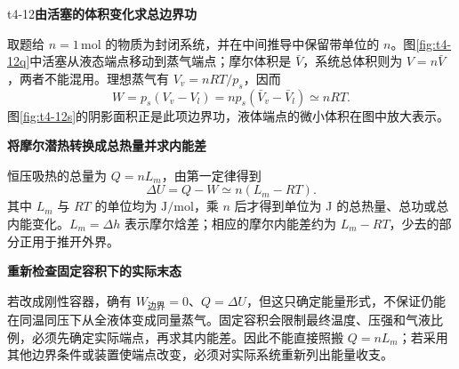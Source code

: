 \begin{drillsolution}{t4-12}\textbf{由活塞的体积变化求总边界功}\par\nobreak
取题给 $n=1\,\mathrm{mol}$ 的物质为封闭系统，并在中间推导中保留带单位的 $n$。图\ref{fig:t4-12q}中活塞从液态端点移动到蒸气端点；摩尔体积是 $\bar V$，系统总体积则为 $V=n\bar V$，两者不能混用。理想蒸气有 $V_v=nRT/p_s$，因而
\[
 \boxed{W=p_s(V_v-V_l)=np_s(\bar V_v-\bar V_l)\simeq nRT}.
\]
图\ref{fig:t4-12s}的阴影面积正是此项边界功，液体端点的微小体积在图中放大表示。



\par\medskip{}\noindent\textbf{将摩尔潜热转换成总热量并求内能差}\par\nobreak
恒压吸热的总量为 $Q=nL_m$，由第一定律得到
\[\boxed{\Delta U=Q-W\simeq n(L_m-RT)}.\]
其中 $L_m$ 与 $RT$ 的单位均为 $\mathrm{J/mol}$，乘 $n$ 后才得到单位为 J 的总热量、总功或总内能变化。$L_m=\Delta h$ 表示摩尔焓差；相应的摩尔内能差约为 $L_m-RT$，少去的部分正用于推开外界。



\par\medskip{}\noindent\textbf{重新检查固定容积下的实际末态}\par\nobreak
若改成刚性容器，确有 $W_{\text{边界}}=0$、$Q=\Delta U$，但这只确定能量形式，不保证仍能在同温同压下从全液体变成同量蒸气。固定容积会限制最终温度、压强和气液比例，必须先确定实际端点，再求其内能差。因此不能直接照搬 $Q=nL_m$；若采用其他边界条件或装置使端点改变，必须对实际系统重新列出能量收支。
\end{drillsolution}
